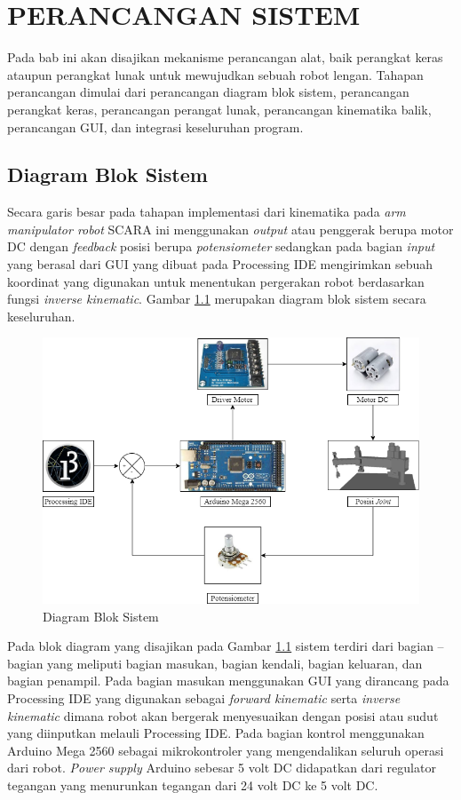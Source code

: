 
\chapter{PERANCANGAN SISTEM}
Pada bab ini akan disajikan mekanisme perancangan alat, baik perangkat keras ataupun perangkat lunak untuk mewujudkan sebuah robot lengan. Tahapan perancangan dimulai dari perancangan diagram blok sistem, perancangan perangkat keras, perancangan perangat lunak, perancangan kinematika balik, perancangan GUI, dan integrasi keseluruhan program. 
\section{ Diagram Blok Sistem }
Secara garis besar pada tahapan implementasi dari kinematika pada \textit{arm manipulator robot} SCARA ini menggunakan \textit{output} atau penggerak berupa motor DC dengan \textit{feedback} posisi berupa \textit{potensiometer} sedangkan pada bagian  \textit{input} yang berasal dari GUI yang dibuat pada Processing IDE mengirimkan sebuah koordinat yang digunakan untuk menentukan pergerakan robot berdasarkan fungsi \textit{inverse kinematic}. Gambar \ref{pic.diagram.bloksistem} merupakan diagram blok sistem secara keseluruhan.
\begin{figure}[H]
	\centering
	\includegraphics[width=13cm]{gambar/Rangkaian_Diagram.png}
	\caption{Diagram Blok Sistem}
	\label{pic.diagram.bloksistem}
\end{figure}
Pada blok diagram yang disajikan pada Gambar \ref{pic.diagram.bloksistem} sistem terdiri dari bagian – bagian yang meliputi bagian masukan, bagian kendali, bagian keluaran, dan bagian penampil. Pada bagian masukan menggunakan GUI yang dirancang pada Processing IDE yang digunakan sebagai \textit{forward kinematic} serta \textit{inverse kinematic} dimana robot akan bergerak menyesuaikan dengan posisi atau sudut yang diinputkan melauli Processing IDE. 
Pada bagian kontrol menggunakan Arduino Mega 2560 sebagai mikrokontroler yang mengendalikan seluruh operasi dari robot. \textit{Power supply} Arduino sebesar 5 volt DC didapatkan dari regulator tegangan yang menurunkan tegangan dari 24 volt DC ke 5 volt DC. 


